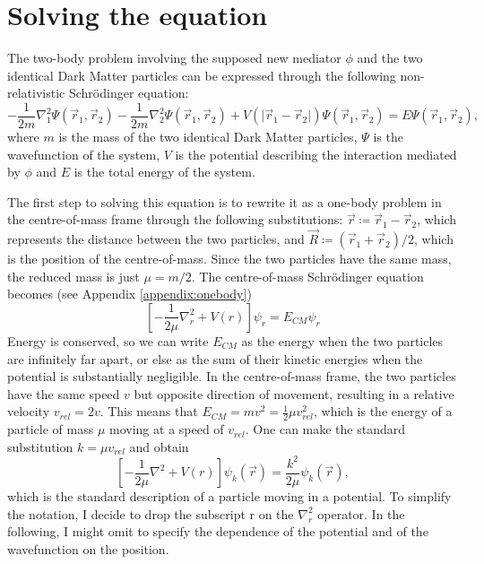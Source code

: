 \chapter{Solving the equation}\label{chap:derivation}
The two-body problem involving the supposed new mediator \(\phi \) and the two identical Dark Matter particles can be expressed through the following non-relativistic Schrödinger equation:
\begin{equation}\label{deriv:initial_equation}
	-\frac{1}{2m} \nabla_1 ^2 \Psi(\vec{r}_1,\vec{r}_2)  - \frac{1}{2m} \nabla_2 ^2 \Psi(\vec{r}_1,\vec{r}_2)  + V(\vert \vec{r}_1 - \vec{r}_2 \vert ) \Psi(\vec{r}_1,\vec{r}_2) =E \Psi (\vec{r}_1,\vec{r}_2),
\end{equation}
where \(m\) is the mass of the two identical Dark Matter particles, \(\Psi\) is the wavefunction of the system, \(V\) is the potential describing the interaction mediated by \(\phi \) and \(E\) is the total energy of the system.

The first step to solving this equation is to rewrite it as a one-body problem in the centre-of-mass frame through the following substitutions: \(\vec{r} \coloneqq  \vec{r}_1 - \vec{r}_2\), which represents the distance between the two particles, and \(\vec{R} \coloneqq (\vec{r}_1 + \vec{r}_2) / 2\), which is the position of the centre-of-mass. Since the two particles have the same mass, the reduced mass is just \(\mu = m / 2\). The centre-of-mass Schrödinger equation becomes (see Appendix \ref{appendix:onebody})
\begin{equation}
	\left[- \frac{1}{2\mu }\nabla _r^2 + V(r)\right]\psi _r = E_{CM} \psi _r
\end{equation}
Energy is conserved, so we can write \(E_{CM} \) as the energy when the two particles are infinitely far apart, or else as the sum of their kinetic energies when the potential is substantially negligible. In the centre-of-mass frame, the two particles have the same speed \(v\) but opposite direction of movement, resulting in a relative velocity \(v_{rel} = 2v\). This means that \(E_{CM} = mv^2 = \frac{1}{2} \mu v_{rel}^2\), which is the energy of a particle of mass \(\mu \) moving at a speed of \(v_{rel} \). One can make the standard substitution \(k=\mu v_{rel} \) and obtain
\begin{equation}
	\left[- \frac{1}{2\mu } \nabla ^2 + V(r)\right] \psi _k (\vec{r}) = \frac{k^2}{2\mu } \psi _k (\vec{r}),
\end{equation}
which is the standard description of a particle moving in a potential. To simplify the notation, I decide to drop the subscript r on the \(\nabla _r ^2\) operator. In the following, I might omit to specify the dependence of the potential and of the wavefunction on the position.

